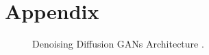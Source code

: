 \documentclass[10pt,twocolumn,letterpaper]{article}
\begin{document}
\newpage
{\small


}


\appendix
\section{Appendix}

\begin{figure}[H]
    \centering

    \caption{Denoising Diffusion GANs Architecture \cite{Xiao22}.}
    \label{fig:intro-1}
\end{figure}
\end{document}
